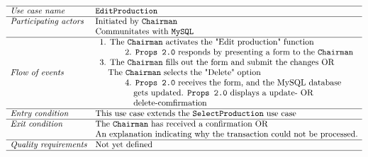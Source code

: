 \documentclass[12pt]{article}
\begin{document}
\\
\\
\[
\begin{array}{ll}
\hline
\textit{Use case name} & \texttt{EditProduction} \\
\hline
\textit{Participating actors} & \text{Initiated by \texttt{Chairman}} \\
& \text{Communitates with \texttt{MySQL}} \\
\hline
\textit{Flow of events} & 
\begin{array}{l}
\text{1. The \texttt{Chairman} activates the "Edit production" function} \\
\quad \quad \quad \text{2. \texttt{Props 2.0} responds by presenting a form to the \texttt{Chairman}}\\
\text{3. The \texttt{Chairman} fills out the form and submit the changes OR} \\ \quad \text{The \texttt{Chairman} selects the "Delete" option} \\
\quad \quad \quad \text{4. \texttt{Props 2.0} receives the form, and the MySQL database} \\ \quad \quad \quad \quad \text{gets updated. \texttt{Props 2.0} displays a update- OR}\\\quad \quad \quad \quad \text{delete-comfirmation} 
\end{array} \\
\hline
\textit{Entry condition} & \text{This use case extends the  \texttt{SelectProduction} use case} \\
\hline
\textit{Exit condition} & \text{The \texttt{Chairman} has received a confirmation OR} \\ & \text{An explanation indicating why the transaction could not be processed.} \\
\hline
\textit{Quality requirements} & \text{Not yet defined} \\
\hline
\end{array}
\]
\\
\\
\end{document}

